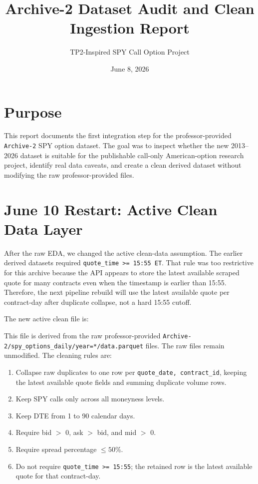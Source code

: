 \documentclass[11pt]{article}
\title{Archive-2 Dataset Audit and Clean Ingestion Report}
\author{TP2-Inspired SPY Call Option Project}
\date{June 8, 2026}
\begin{document}
\maketitle

\section*{Purpose}

This report documents the first integration step for the professor-provided
\texttt{Archive-2} SPY option dataset. The goal was to inspect whether the new
2013--2026 dataset is suitable for the publishable call-only American-option
research project, identify real data caveats, and create a clean derived dataset
without modifying the raw professor-provided files.

\section*{June 10 Restart: Active Clean Data Layer}

After the raw EDA, we changed the active clean-data assumption. The earlier
derived datasets required \texttt{quote\_time >= 15:55 ET}. That rule was too
restrictive for this archive because the API appears to store the latest
available scraped quote for many contracts even when the timestamp is earlier
than 15:55. Therefore, the next pipeline rebuild will use the latest available
quote per contract-day after duplicate collapse, not a hard 15:55 cutoff.

The new active clean file is:

\begin{quote}
\small{}
\end{quote}

This file is derived from the raw professor-provided
\texttt{Archive-2/spy\_options\_daily/year=*/data.parquet} files. The raw files
remain unmodified. The cleaning rules are:

\begin{enumerate}
  \item Collapse raw duplicates to one row per \texttt{quote\_date,
  contract\_id}, keeping the latest available quote fields and summing duplicate
  volume rows.
  \item Keep SPY calls only across all moneyness levels.
  \item Keep DTE from 1 to 90 calendar days.
  \item Require bid $>$ 0, ask $>$ bid, and mid $>$ 0.
  \item Require spread percentage $\leq 50\%$.
  \item Do not require \texttt{quote\_time >= 15:55}; the retained row is the
  latest available quote for that contract-day.
\end{enumerate}
\end{document}
